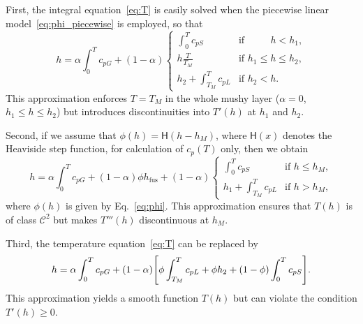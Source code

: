 \documentclass[final]{elsarticle} %
\newcommand{\fusion}[1]{{#1}_\text{fus}}
\begin{document}
First, the integral equation~\eqref{eq:T} is easily solved
when the piecewise linear model~\eqref{eq:phi_piecewise} is employed, so that
\begin{equation}\label{eq:h_model1}
    h = \alpha \int_0^T c_{pG} + (1-\alpha)\begin{cases}
        \int_0^T c_{pS}           &\text{if }\qquad\,\, h < h_1, \\
        h\frac{T}{T_M}            &\text{if } h_1 \leq h \leq h_2, \\
        h_2 + \int_{T_M}^T c_{pL} &\text{if } h_2 < h.
    \end{cases}
\end{equation}
This approximation enforces $T=T_M$ in the whole mushy layer
($\alpha=0$, $h_1 \leq h \leq h_2$)
but introduces discontinuities into $T'(h)$ at $h_1$ and $h_2$.

Second, if we assume that $\phi(h) = \mathsf{H}(h-h_M)$,
where $\mathsf{H}(x)$ denotes the Heaviside step function,
for calculation of $c_p(T)$ only, then we obtain
\begin{equation}\label{eq:h_model2}
    h = \alpha \int_0^T c_{pG}
        + (1-\alpha)\phi\fusion{h} + (1-\alpha)
    \begin{cases}
        \int_0^T c_{pS}           &\text{if } h \leq h_M, \\
        h_1 + \int_{T_M}^T c_{pL} &\text{if } h > h_M,
    \end{cases}
\end{equation}
where $\phi(h)$ is given by Eq.~\eqref{eq:phi}.
This approximation ensures that $T(h)$ is of class $\mathcal{C}^2$
but makes $T'''(h)$ discontinuous at $h_M$.

Third, the temperature equation~\eqref{eq:T} can be replaced by
\begin{equation}\label{eq:h_model3}
    h = \alpha \int_0^T c_{pG} + (1-\alpha)
        \qty[ \phi\int_{T_M}^T c_{pL}+ \phi h_2 + (1-\phi)\int_0^T c_{pS} ].
\end{equation}
This approximation yields a smooth function $T(h)$ but can violate the condition $T'(h)\geq0$.
\end{document}
